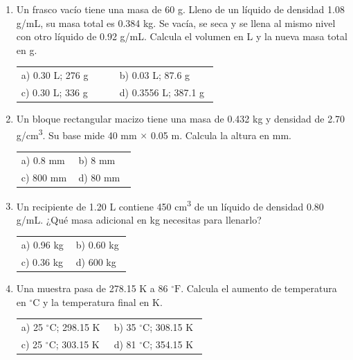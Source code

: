 \documentclass[11pt,a4paper]{article}
\begin{document}
\begin{enumerate}[label=\textbf{\arabic*.},leftmargin=*,itemsep=16pt,topsep=0pt]
\item \begin{minipage}[t]{\linewidth}
Un frasco vacío tiene una masa de 60 g. Lleno de un líquido de densidad 1.08 g/mL, su masa total es 0.384 kg. Se vacía, se seca y se llena al mismo nivel con otro líquido de 0.92 g/mL. Calcula el volumen en L y la nueva masa total en g.

\vspace{7pt}
\begin{tabular}{@{}p{0.48\linewidth}p{0.48\linewidth}@{}}
a) 0.30 L; 276 g & b) 0.03 L; 87.6 g \\[5pt]
c) 0.30 L; 336 g & d) 0.3556 L; 387.1 g \\
\end{tabular}
\end{minipage}

\item \begin{minipage}[t]{\linewidth}
Un bloque rectangular macizo tiene una masa de 0.432 kg y densidad de 2.70 g/cm\textsuperscript{3}. Su base mide 40 mm \(\times\) 0.05 m. Calcula la altura en mm.

\vspace{7pt}
\begin{tabular}{@{}p{0.48\linewidth}p{0.48\linewidth}@{}}
a) 0.8 mm & b) 8 mm \\[5pt]
c) 800 mm & d) 80 mm \\
\end{tabular}
\end{minipage}

\item \begin{minipage}[t]{\linewidth}
Un recipiente de 1.20 L contiene 450 cm\textsuperscript{3} de un líquido de densidad 0.80 g/mL. ¿Qué masa adicional en kg necesitas para llenarlo?

\vspace{7pt}
\begin{tabular}{@{}p{0.48\linewidth}p{0.48\linewidth}@{}}
a) 0.96 kg & b) 0.60 kg \\[5pt]
c) 0.36 kg & d) 600 kg \\
\end{tabular}
\end{minipage}

\item \begin{minipage}[t]{\linewidth}
Una muestra pasa de 278.15 K a 86 \({}^{\circ}\mathrm{F}\). Calcula el aumento de temperatura en \({}^{\circ}\mathrm{C}\) y la temperatura final en K.

\vspace{7pt}
\begin{tabular}{@{}p{0.48\linewidth}p{0.48\linewidth}@{}}
a) 25 \({}^{\circ}\mathrm{C}\); 298.15 K & b) 35 \({}^{\circ}\mathrm{C}\); 308.15 K \\[5pt]
c) 25 \({}^{\circ}\mathrm{C}\); 303.15 K & d) 81 \({}^{\circ}\mathrm{C}\); 354.15 K \\
\end{tabular}
\end{minipage}

\end{enumerate}
\end{document}
